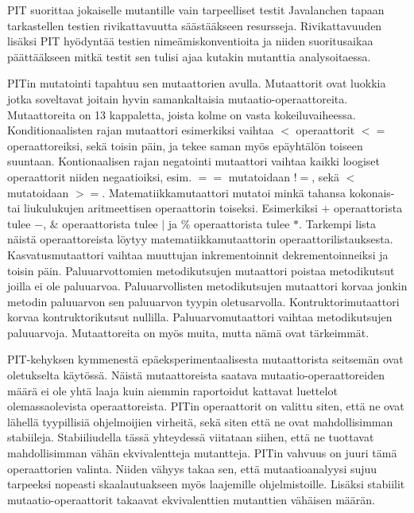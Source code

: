 \documentclass{tktltiki}
\begin{document}
PIT suorittaa jokaiselle mutantille vain tarpeelliset testit Javalanchen tapaan tarkastellen testien rivikattavuutta säästääkseen resursseja. Rivikattavuuden lisäksi PIT hyödyntää testien nimeämiskonventioita ja niiden suoritusaikaa päättääkseen mitkä testit sen tulisi ajaa kutakin mutanttia analysoitaessa.

PITin mutatointi tapahtuu sen mutaattorien avulla. Mutaattorit ovat luokkia jotka soveltavat joitain hyvin samankaltaisia mutaatio-operaattoreita. Mutaattoreita on 13 kappaletta, joista kolme on vasta kokeiluvaiheessa. Konditionaalisten rajan mutaattori esimerkiksi vaihtaa $<$ operaattorit $<=$ operaattoreiksi, sekä toisin päin, ja tekee saman myös epäyhtälön toiseen suuntaan. Kontionaalisen rajan negatointi mutaattori vaihtaa kaikki loogiset operaattorit niiden negaatioiksi, esim. $==$ mutatoidaan $!=$, sekä $<$ mutatoidaan $>=$. Matematiikkamutaattori mutatoi minkä tahansa kokonais- tai liukulukujen aritmeettisen operaattorin toiseksi. Esimerkiksi $+$ operaattorista tulee $-$, $\&$ operaattorista tulee $|$ ja $\%$ operaattorista tulee $*$. Tarkempi lista näistä operaattoreista löytyy matematiikkamutaattorin operaattorilistauksesta. Kasvatusmutaattori vaihtaa muuttujan inkrementoinnit dekrementoinneiksi ja toisin päin. Paluuarvottomien metodikutsujen mutaattori poistaa metodikutsut joilla ei ole paluuarvoa. Paluuarvollisten metodikutsujen mutaattori korvaa jonkin metodin paluuarvon sen paluuarvon tyypin oletusarvolla. Kontruktorimutaattori korvaa kontruktorikutsut nullilla. Paluuarvomutaattori vaihtaa metodikutsujen paluuarvoja. Mutaattoreita on myös muita, mutta nämä ovat tärkeimmät.

PIT-kehyksen kymmenestä epäeksperimentaalisesta mutaattorista seitsemän ovat oletukselta käytössä. Näistä mutaattoreista saatava mutaatio-operaattoreiden määrä ei ole yhtä laaja kuin aiemmin raportoidut kattavat luettelot olemassaolevista operaattoreista. PITin operaattorit on valittu siten, että ne ovat lähellä tyypillisiä ohjelmoijien virheitä, sekä siten että ne ovat mahdollisimman stabiileja. Stabiiliudella tässä yhteydessä viitataan siihen, että ne tuottavat mahdollisimman vähän ekvivalentteja mutantteja. PITin vahvuus on juuri tämä operaattorien valinta. Niiden vähyys takaa sen, että mutaatioanalyysi sujuu tarpeeksi nopeasti skaalautuakseen myös laajemille ohjelmistoille. Lisäksi stabiilit mutaatio-operaattorit takaavat ekvivalenttien mutanttien vähäisen määrän.
\end{document}
